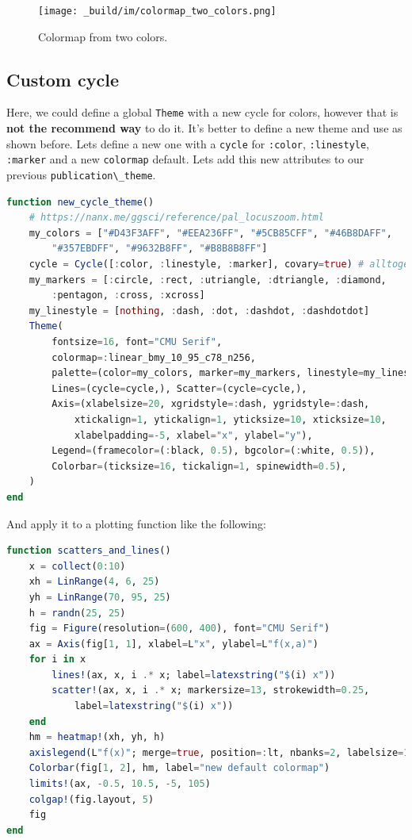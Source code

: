 \documentclass[
  notoc %
]{tufte-book}
\newcommand{\passthrough}[1]{#1}
\begin{document}
\begin{figure}
\hypertarget{fig:colormap_two_colors}{%
\centering
\texttt{[image: \_build/im/colormap\_two\_colors.png]}
\caption{Colormap from two colors.}\label{fig:colormap_two_colors}
}
\end{figure}

\hypertarget{custom-cycle}{%
\subsection{Custom cycle}\label{custom-cycle}}

Here, we could define a global \passthrough{\lstinline!Theme!} with a
new cycle for colors, however that is \textbf{not the recommend way} to
do it. It's better to define a new theme and use as shown before. Lets
define a new one with a \passthrough{\lstinline!cycle!} for
\passthrough{\lstinline!:color!}, \passthrough{\lstinline!:linestyle!},
\passthrough{\lstinline!:marker!} and a new
\passthrough{\lstinline!colormap!} default. Lets add this new attributes
to our previous \passthrough{\lstinline!publication\_theme!}.

\begin{lstlisting}[language=Julia]
function new_cycle_theme()
    # https://nanx.me/ggsci/reference/pal_locuszoom.html
    my_colors = ["#D43F3AFF", "#EEA236FF", "#5CB85CFF", "#46B8DAFF",
        "#357EBDFF", "#9632B8FF", "#B8B8B8FF"]
    cycle = Cycle([:color, :linestyle, :marker], covary=true) # alltogether
    my_markers = [:circle, :rect, :utriangle, :dtriangle, :diamond,
        :pentagon, :cross, :xcross]
    my_linestyle = [nothing, :dash, :dot, :dashdot, :dashdotdot]
    Theme(
        fontsize=16, font="CMU Serif",
        colormap=:linear_bmy_10_95_c78_n256,
        palette=(color=my_colors, marker=my_markers, linestyle=my_linestyle),
        Lines=(cycle=cycle,), Scatter=(cycle=cycle,),
        Axis=(xlabelsize=20, xgridstyle=:dash, ygridstyle=:dash,
            xtickalign=1, ytickalign=1, yticksize=10, xticksize=10,
            xlabelpadding=-5, xlabel="x", ylabel="y"),
        Legend=(framecolor=(:black, 0.5), bgcolor=(:white, 0.5)),
        Colorbar=(ticksize=16, tickalign=1, spinewidth=0.5),
    )
end
\end{lstlisting}

And apply it to a plotting function like the following:

\begin{lstlisting}[language=Julia]
function scatters_and_lines()
    x = collect(0:10)
    xh = LinRange(4, 6, 25)
    yh = LinRange(70, 95, 25)
    h = randn(25, 25)
    fig = Figure(resolution=(600, 400), font="CMU Serif")
    ax = Axis(fig[1, 1], xlabel=L"x", ylabel=L"f(x,a)")
    for i in x
        lines!(ax, x, i .* x; label=latexstring("$(i) x"))
        scatter!(ax, x, i .* x; markersize=13, strokewidth=0.25,
            label=latexstring("$(i) x"))
    end
    hm = heatmap!(xh, yh, h)
    axislegend(L"f(x)"; merge=true, position=:lt, nbanks=2, labelsize=14)
    Colorbar(fig[1, 2], hm, label="new default colormap")
    limits!(ax, -0.5, 10.5, -5, 105)
    colgap!(fig.layout, 5)
    fig
end
\end{lstlisting}
\end{document}
